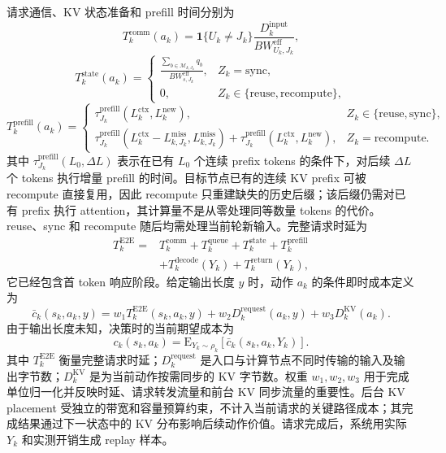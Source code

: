 请求通信、KV 状态准备和 prefill 时间分别为
\[
T_k^{\mathrm{comm}}(a_k)
=
\mathbf{1}\{U_k\ne J_k\}
\frac{D_k^{\mathrm{input}}}{BW_{U_k,J_k}^{\mathrm{eff}}},
\]
\[
T_k^{\mathrm{state}}(a_k)
=
\left\{
\begin{array}{ll}
\displaystyle
\frac{\sum_{b\in\mathcal M_{k,J_k}}q_b}
{BW_{s,J_k}^{\mathrm{eff}}},
&Z_k=\mathrm{sync},\\
0,&Z_k\in\{\mathrm{reuse},\mathrm{recompute}\},
\end{array}
\right.
\]
\[
T_k^{\mathrm{prefill}}(a_k)
=
\left\{
\begin{array}{ll}
\tau_{J_k}^{\mathrm{prefill}}
(L_k^{\mathrm{ctx}},L_k^{\mathrm{new}}),
&Z_k\in\{\mathrm{reuse},\mathrm{sync}\},\\
\tau_{J_k}^{\mathrm{prefill}}
(L_k^{\mathrm{ctx}}-L_{k,J_k}^{\mathrm{miss}},
 L_{k,J_k}^{\mathrm{miss}})
+\tau_{J_k}^{\mathrm{prefill}}
(L_k^{\mathrm{ctx}},L_k^{\mathrm{new}}),
&Z_k=\mathrm{recompute}.
\end{array}
\right.
\]
其中 \(\tau_{J_k}^{\mathrm{prefill}}(L_0,\Delta L)\) 表示在已有 \(L_0\) 个连续 prefix tokens 的条件下，对后续 \(\Delta L\) 个 tokens 执行增量 prefill 的时间。目标节点已有的连续 KV prefix 可被 recompute 直接复用，因此 recompute 只重建缺失的历史后缀；该后缀仍需对已有 prefix 执行 attention，其计算量不是从零处理同等数量 tokens 的代价。reuse、sync 和 recompute 随后均需处理当前轮新输入。完整请求时延为
\[
\begin{array}{rl}
T_k^{\mathrm{E2E}}
={}&T_k^{\mathrm{comm}}+T_k^{\mathrm{queue}}
+T_k^{\mathrm{state}}+T_k^{\mathrm{prefill}}\\
&+T_k^{\mathrm{decode}}(Y_k)+T_k^{\mathrm{return}}(Y_k),
\end{array}
\]
它已经包含首 token 响应阶段。给定输出长度 \(y\) 时，动作 \(a_k\) 的条件即时成本定义为
\[
\bar c_k(s_k,a_k,y)
=
w_1T_k^{\mathrm{E2E}}(s_k,a_k,y)
+w_2D_k^{\mathrm{request}}(a_k,y)
+w_3D_k^{\mathrm{KV}}(a_k).
\]
由于输出长度未知，决策时的当前期望成本为
\[
c_k(s_k,a_k)
=
\mathrm E_{Y_k\sim\rho_k}
\left[\bar c_k(s_k,a_k,Y_k)\right].
\]
其中 \(T_k^{\mathrm{E2E}}\) 衡量完整请求时延；\(D_k^{\mathrm{request}}\) 是入口与计算节点不同时传输的输入及输出字节数；\(D_k^{\mathrm{KV}}\) 是为当前动作按需同步的 KV 字节数。权重 \(w_1,w_2,w_3\) 用于完成单位归一化并反映时延、请求转发流量和前台 KV 同步流量的重要性。后台 KV placement 受独立的带宽和容量预算约束，不计入当前请求的关键路径成本；其完成结果通过下一状态中的 KV 分布影响后续动作价值。请求完成后，系统用实际 \(Y_k\) 和实测开销生成 replay 样本。

